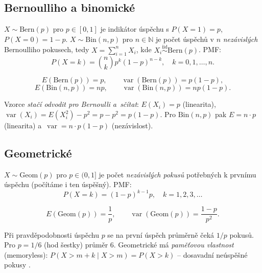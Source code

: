 \documentclass[11pt,a4paper]{article}
\DeclareMathOperator{\Var}{var}
\newcommand{\N}{\mathbb{N}}
\begin{document}
\subsection{Bernoulliho a binomické}

\begin{definice}
$X\sim\mathrm{Bern}(p)$ pro $p\in[0,1]$ je indikátor úspěchu s $P(X=1)=p$, $P(X=0)=1-p$. $X\sim\mathrm{Bin}(n,p)$ pro $n\in\N$ je počet úspěchů v $n$ \emph{nezávislých} Bernoulliho pokusech, tedy $X=\sum_{i=1}^n X_i$, kde $X_i\stackrel{\text{iid}}{\sim}\mathrm{Bern}(p)$. PMF:
\[
P(X=k)=\binom{n}{k}p^k(1-p)^{n-k},\quad k=0,1,\dots,n.
\]
\end{definice}

\begin{veta}
\[
E(\mathrm{Bern}(p))=p,\qquad \Var(\mathrm{Bern}(p))=p(1-p),
\]
\[
E(\mathrm{Bin}(n,p))=np,\qquad \Var(\mathrm{Bin}(n,p))=np(1-p).
\]
\end{veta}

\begin{intuice}
Vzorce \emph{stačí odvodit pro Bernoulli a~sčítat}: $E(X_i)=p$ (linearita), $\Var(X_i)=E(X_i^2)-p^2=p-p^2=p(1-p)$. Pro $\mathrm{Bin}(n,p)$ pak $E=n\cdot p$ (linearita) a~$\Var=n\cdot p(1-p)$ (nezávislost).
\end{intuice}


\subsection{Geometrické}

\begin{definice}
$X\sim\mathrm{Geom}(p)$ pro $p\in(0,1]$ je počet \emph{nezávislých pokusů} potřebných k prvnímu úspěchu (počítáme i ten úspěšný). PMF:
\[
P(X=k)=(1-p)^{k-1}p,\quad k=1,2,3,\dots
\]
\end{definice}

\begin{veta}
\[
E(\mathrm{Geom}(p))=\frac{1}{p},\qquad \Var(\mathrm{Geom}(p))=\frac{1-p}{p^2}.
\]
\end{veta}

\begin{intuice}
Při pravděpodobnosti úspěchu $p$ se na první úspěch průměrně čeká $1/p$ pokusů. Pro $p=1/6$ (hod šestky) průměr $6$. Geometrické má \emph{paměťovou vlastnost} (memoryless): $P(X>m+k\mid X>m)=P(X>k)$ -- dosavadní neúspěšné pokusy .
\end{intuice}
\end{document}

